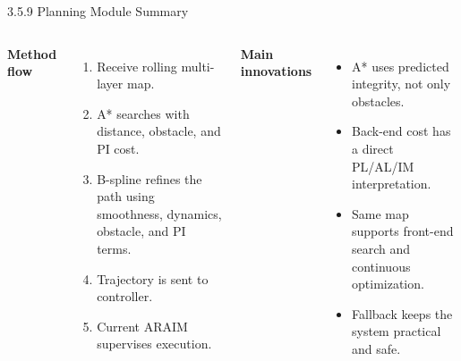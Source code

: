 \documentclass[10pt,aspectratio=169,xcolor=dvipsnames]{beamer}
\begin{document}
\begin{frame}{3.5.9 Planning Module Summary}
  \small
  \begin{columns}[T]
    \textbf{Method flow}
    \begin{enumerate}\footnotesize
      \item Receive rolling multi-layer map.
      \item A* searches with distance, obstacle, and PI cost.
      \item B-spline refines the path using smoothness, dynamics, obstacle, and PI terms.
      \item Trajectory is sent to controller.
      \item Current ARAIM supervises execution.
    \end{enumerate}

    \textbf{Main innovations}
    \begin{itemize}\footnotesize
      \item A* uses predicted integrity, not only obstacles.
      \item Back-end cost has a direct PL/AL/IM interpretation.
      \item Same map supports front-end search and continuous optimization.
      \item Fallback keeps the system practical and safe.
    \end{itemize}
  \end{columns}
\end{frame}

\end{document}
